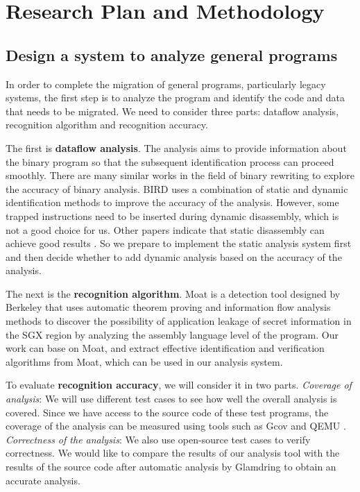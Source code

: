 \section{Research Plan and Methodology}
\subsection{Design a system to analyze general programs}
\label{sec:ToolToAnalyze}
In order to complete the migration of general programs, particularly legacy systems,
the first step is to analyze the program and identify the code and data that needs to
be migrated. We need to consider three parts: dataflow analysis, recognition algorithm
and recognition accuracy.

The first is \textbf{dataflow analysis}. The analysis aims to provide
information about the binary program so that the subsequent identification process
can proceed smoothly.
There are many similar works in the field of binary rewriting to explore
the accuracy of binary analysis.
BIRD \cite{Nanda2006BIRDBI} uses a combination of static and dynamic identification
methods to improve the accuracy of the analysis. However, some trapped instructions
need to be inserted during dynamic disassembly, which is not a good choice for us.
Other papers indicate that static disassembly can achieve good results
\cite{Andriesse2016AnIA}. So we prepare to implement the static analysis system first
and then decide whether to add dynamic analysis based on the accuracy of the analysis.

The next is the \textbf{recognition algorithm}.
Moat \cite{Sinha2015MoatVC} is a detection tool designed by Berkeley that uses
automatic theorem proving and information flow analysis methods to discover the
possibility of application leakage of secret information in the SGX region by
analyzing the assembly language level of the program.
Our work can base on Moat, and extract effective identification and verification
algorithms from Moat, which can be used in our analysis system.

To evaluate \textbf{recognition accuracy}, we will consider it in two parts.
\textit{Coverage of analysis}:
We will use different test cases to see how well the overall analysis is covered.
Since we have access to the source code of these test programs,
the coverage of the analysis can be measured using tools such as Gcov \cite{GCOV}
and QEMU \cite{Bellard2005QEMUAF}.
\textit{Correctness of the analysis}:
We also use open-source test cases to verify correctness.
We would like to compare the results of our analysis tool with the results of the
source code after automatic analysis by Glamdring \cite{Lind2017GlamdringAA} to obtain
an accurate analysis.

